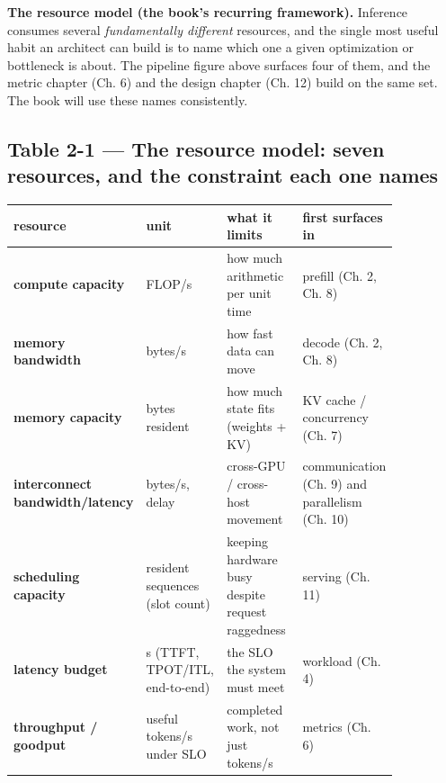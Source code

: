 \textbf{The resource model (the book's recurring framework).} Inference
consumes several \emph{fundamentally different} resources, and the
single most useful habit an architect can build is to name which one a
given optimization or bottleneck is about. The pipeline figure above
surfaces four of them, and the metric chapter (Ch. 6) and the design
chapter (Ch. 12) build on the same set. The book will use these names
consistently.

\subsection{Table 2-1 --- The resource model: seven resources, and the
constraint each one
names}\label{table-2-1-the-resource-model-seven-resources-and-the-constraint-each-one-names}

\nopagebreak[4]
\begin{longtable}[]{@{}
  >{\raggedright\arraybackslash}p{0.2127\linewidth}
  >{\raggedright\arraybackslash}p{0.2127\linewidth}
  >{\raggedright\arraybackslash}p{0.2127\linewidth}
  >{\raggedright\arraybackslash}p{0.2127\linewidth}@{}}
\toprule\noalign{}
\begin{minipage}[b]{\linewidth}\raggedright
resource
\end{minipage} & \begin{minipage}[b]{\linewidth}\raggedright
unit
\end{minipage} & \begin{minipage}[b]{\linewidth}\raggedright
what it limits
\end{minipage} & \begin{minipage}[b]{\linewidth}\raggedright
first surfaces in
\end{minipage} \\
\midrule\noalign{}
\endhead
\bottomrule\noalign{}
\endlastfoot
\textbf{compute capacity} & FLOP/s & how much arithmetic per unit time &
prefill (Ch. 2, Ch. 8) \\
\noalign{\label{tab:2.1}}
\textbf{memory bandwidth} & bytes/s & how fast data can move & decode
(Ch. 2, Ch. 8) \\
\textbf{memory capacity} & bytes resident & how much state fits (weights
+ KV) & KV cache / concurrency (Ch. 7) \\
\textbf{interconnect bandwidth/latency} & bytes/s, delay & cross-GPU /
cross-host movement & communication (Ch. 9) and parallelism (Ch. 10) \\
\textbf{scheduling capacity} & resident sequences (slot count) & keeping
hardware busy despite request raggedness & serving (Ch. 11) \\
\textbf{latency budget} & s (TTFT, TPOT/ITL, end-to-end) & the SLO the
system must meet & workload (Ch. 4) \\
\textbf{throughput / goodput} & useful tokens/s under SLO & completed
work, not just tokens/s & metrics (Ch. 6) \\
\end{longtable}

